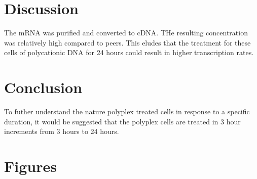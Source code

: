 \documentclass[journal, a4paper]{IEEEtran}
\begin{document}
\section{Discussion}

The mRNA was purified and converted to cDNA. THe resulting concentration was relatively high compared to peers. This eludes that the
treatment for these cells of polycationic DNA for 24 hours could result in higher transcription rates.

\section{Conclusion}

To futher understand the nature polyplex treated cells in response to a specific duration,
it would be suggested that the polyplex cells are treated in 3 hour increments from 3 hours to 24 hours.


\section{Figures}

\end{document}
